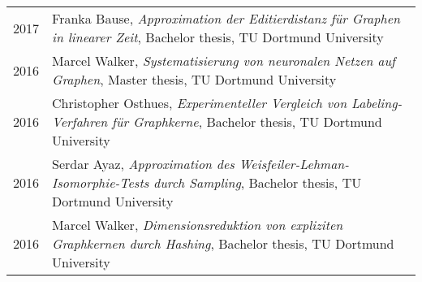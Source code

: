 \documentclass[10pt, a4paper, DIV=14, headings=small]{scrartcl}
\begin{document}
\begin{longtabu}{p{2.1cm}p{12.0cm}}
	2017 & Franka Bause, \emph{Approximation der Editierdistanz für Graphen in linearer Zeit}, Bachelor thesis, TU Dortmund University                                                                          \\
	2016 & Marcel Walker, \emph{Systematisierung von neuronalen Netzen auf Graphen}, Master thesis, TU Dortmund University                                                                                      \\
	2016 & Christopher Osthues, \emph{Experimenteller Vergleich von Labeling-Verfahren für Graphkerne}, Bachelor thesis, TU Dortmund University                                                                 \\
	2016 & Serdar Ayaz, \emph{Approximation des Weisfeiler-Lehman-Isomorphie-Tests durch Sampling}, Bachelor thesis, TU Dortmund University                                                                     \\
	2016 & Marcel Walker, \emph{Dimensionsreduktion von expliziten Graphkernen durch Hashing}, Bachelor thesis, TU Dortmund University                                                                          \\
\end{longtabu}
\end{document}
